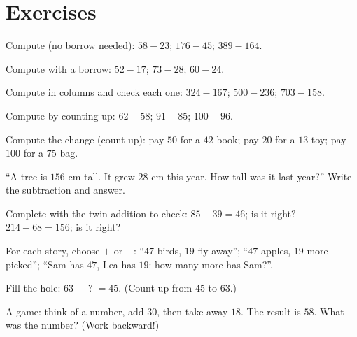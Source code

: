 \section{Exercises}

\begin{exercise}[$\star$]\label{exo:g2:subtraction:1}
Compute (no borrow needed): $58 - 23$; \quad $176 - 45$; \quad
$389 - 164$.
\end{exercise}

\begin{exercise}[$\star$]\label{exo:g2:subtraction:2}
Compute with a borrow: $52 - 17$; \quad $73 - 28$; \quad
$60 - 24$.
\end{exercise}

\begin{exercise}[$\star$]\label{exo:g2:subtraction:3}
Compute in columns and check each one: $324 - 167$; \quad
$500 - 236$; \quad $703 - 158$.
\end{exercise}

\begin{exercise}[$\star$]\label{exo:g2:subtraction:4}
Compute by counting up: $62 - 58$; \quad $91 - 85$; \quad
$100 - 96$.
\end{exercise}

\begin{exercise}[$\star$]\label{exo:g2:subtraction:5}
Compute the change (count up): pay $50$ for a $42$ book; pay $20$
for a $13$ toy; pay $100$ for a $75$ bag.
\end{exercise}

\begin{exercise}[$\star$]\label{exo:g2:subtraction:6}
``A tree is $156$ cm tall. It grew $28$ cm this year. How tall was
it last year?'' Write the subtraction and answer.
\end{exercise}

\begin{exercise}[$\star$]\label{exo:g2:subtraction:7}
Complete with the twin addition to check: $85 - 39 = 46$; is it
right? $214 - 68 = 156$; is it right?
\end{exercise}

\begin{exercise}[$\star$]\label{exo:g2:subtraction:8}
For each story, choose $+$ or $-$: ``$47$ birds, $19$ fly away'';
``$47$ apples, $19$ more picked''; ``Sam has $47$, Lea has $19$:
how many more has Sam?''.
\end{exercise}

\begin{exercise}[$\star$]\label{exo:g2:subtraction:9}
Fill the hole: $63 - \;?\; = 45$. (Count up from $45$ to $63$.)
\end{exercise}

\begin{exercise}[$\star\star$]\label{exo:g2:subtraction:10}
A game: think of a number, add $30$, then take away $18$. The
result is $58$. What was the number? (Work backward!)
\end{exercise}
